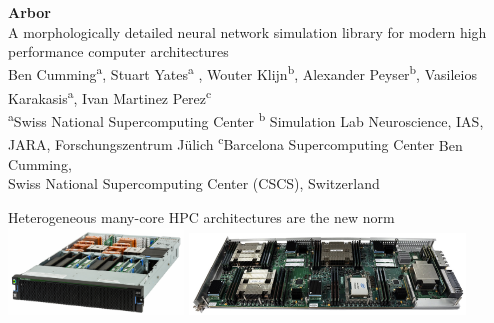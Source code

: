 \documentclass[a0paper,portrait]{baposter}
\newcommand{\arbor}{{\textcolor{blue!30!black}{Arbor}}\xspace}
\newcommand{\julich}{J\"ulich\xspace}
\begin{document}
\begin{poster}
{
  \vspace{0.3\headerheight}
}
{ \Huge
  \textbf{\arbor} \\[0.1\baselineskip]
\large 
  A morphologically detailed neural network simulation library for modern high performance computer architectures \\[0.2\baselineskip]
  \small
    Ben Cumming\textsuperscript{a}, Stuart Yates\textsuperscript{a} , Wouter Klijn\textsuperscript{b}, Alexander Peyser\textsuperscript{b}, Vasileios Karakasis\textsuperscript{a}, Ivan Martinez Perez\textsuperscript{c}\\
    \textsuperscript{a}Swiss National Supercomputing Center \hspace{2mm}\textsuperscript{b}
Simulation Lab Neuroscience, IAS, JARA, Forschungszentrum \julich
 \hspace{2mm}\textsuperscript{c}Barcelona Supercomputing Center
}
{\small
    \vspace{1em} Ben Cumming, \\[0.5em]
    Swiss National Supercomputing Center (CSCS), Switzerland\\
}


\begin{posterbox}[name=motivation,column=0,row=0,span=2]{Heterogeneous many-core  HPC architectures are the new norm}
    \hfill
    \includegraphics[width=0.35\textwidth]{images/juron.jpg}
    \hfill
    \includegraphics[width=0.55\textwidth]{images/knlnode.jpg}
    \hspace{0.5cm}


\end{posterbox}
\end{poster}
\end{document}
